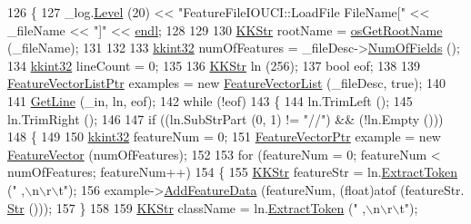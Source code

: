 \begin{DoxyCode}
126 \{
127   \_log.\hyperlink{class_k_k_b_1_1_run_log_a32cf761d7f2e747465fd80533fdbb659}{Level} (20) << \textcolor{stringliteral}{"FeatureFileIOUCI::LoadFile   FileName["} << \_fileName << \textcolor{stringliteral}{"]"} << 
      \hyperlink{namespace_k_k_b_ad1f50f65af6adc8fa9e6f62d007818a8}{endl};
128 
129 
130   \hyperlink{class_k_k_b_1_1_k_k_str}{KKStr}  rootName = \hyperlink{namespace_k_k_b_af5b668ed9902d7f93b62529664a739f0}{osGetRootName} (\_fileName);
131 
132 
133   \hyperlink{namespace_k_k_b_a8fa4952cc84fda1de4bec1fbdd8d5b1b}{kkint32}  numOfFeatures = \_fileDesc->\hyperlink{class_k_k_m_l_l_1_1_file_desc_a07abdfb77949dee565c555c7651581c2}{NumOfFields} ();
134   \hyperlink{namespace_k_k_b_a8fa4952cc84fda1de4bec1fbdd8d5b1b}{kkint32}  lineCount = 0;
135 
136   \hyperlink{class_k_k_b_1_1_k_k_str}{KKStr}  ln (256);
137   \textcolor{keywordtype}{bool}  eof;
138 
139   \hyperlink{class_k_k_m_l_l_1_1_feature_vector_list}{FeatureVectorListPtr}  examples = \textcolor{keyword}{new} \hyperlink{class_k_k_m_l_l_1_1_feature_vector_list}{FeatureVectorList} (\_fileDesc, \textcolor{keyword}{
      true});
140 
141   \hyperlink{class_k_k_m_l_l_1_1_feature_file_i_o_a61ca11485d2c14368c1019bfcc53ab16}{GetLine} (\_in, ln, eof);
142   \textcolor{keywordflow}{while}  (!eof)
143   \{
144     ln.TrimLeft ();
145     ln.TrimRight ();
146 
147     \textcolor{keywordflow}{if}  ((ln.SubStrPart (0, 1) != \textcolor{stringliteral}{"//"})  &&  (!ln.Empty ()))
148     \{
149 
150       \hyperlink{namespace_k_k_b_a8fa4952cc84fda1de4bec1fbdd8d5b1b}{kkint32}  featureNum = 0;
151       \hyperlink{class_k_k_m_l_l_1_1_feature_vector}{FeatureVectorPtr}  example = \textcolor{keyword}{new} \hyperlink{class_k_k_m_l_l_1_1_feature_vector}{FeatureVector} (numOfFeatures);
152   
153       \textcolor{keywordflow}{for}  (featureNum = 0;  featureNum < numOfFeatures;  featureNum++)
154       \{
155         \hyperlink{class_k_k_b_1_1_k_k_str}{KKStr}  featureStr = ln.\hyperlink{class_k_k_b_1_1_k_k_str_acc31c95308d6d699debde883c11e5802}{ExtractToken} (\textcolor{stringliteral}{" ,\(\backslash\)n\(\backslash\)r\(\backslash\)t"});
156         example->\hyperlink{class_k_k_m_l_l_1_1_feature_vector_abf364e3348c041cd7be6f14d6c4567cf}{AddFeatureData} (featureNum, (\textcolor{keywordtype}{float})atof (featureStr.
      \hyperlink{class_k_k_b_1_1_k_k_str_ad574e6c0fe7f6ce1ba3ab0a8ce2fbd52}{Str} ()));
157       \}
158 
159       \hyperlink{class_k_k_b_1_1_k_k_str}{KKStr}  className = ln.\hyperlink{class_k_k_b_1_1_k_k_str_acc31c95308d6d699debde883c11e5802}{ExtractToken} (\textcolor{stringliteral}{" ,\(\backslash\)n\(\backslash\)r\(\backslash\)t"});

\end{DoxyCode}
